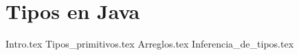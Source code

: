 \section{Tipos en Java}
  {Intro.tex}
  {Tipos_primitivos.tex}
  {Arreglos.tex}
  {Inferencia_de_tipos.tex}